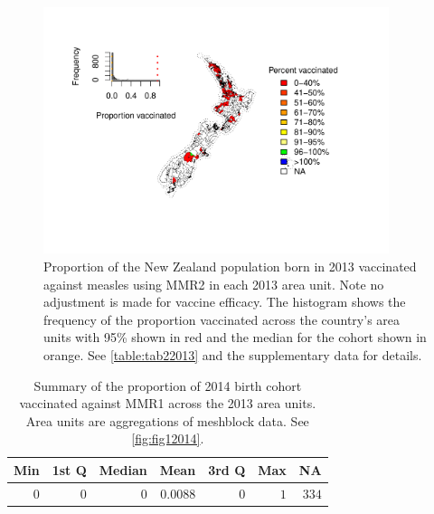 \documentclass{article}
\begin{document}
\begin{figure}
\begin{center}
    \includegraphics[width=0.9\textwidth]{nir_census_MMR2_NIR_2013.pdf}
\end{center}
\caption{Proportion of the New Zealand population born in 2013 vaccinated against measles using MMR2 in each 2013 area unit. Note no adjustment is made for vaccine efficacy. The histogram shows the frequency of the proportion vaccinated across the country's area units with 95\% shown in red and the median for the cohort shown in orange. See \autoref{table:tab22013} and the supplementary data for details.}
\label{fig:fig22013}
\end{figure}

 \vspace{5mm} %
\begin{table}
\begin{center}
\begin{tabular}{rrrrrrr}
\hline\hline
\multicolumn{1}{c}{Min}&\multicolumn{1}{c}{1st Q}&\multicolumn{1}{c}{Median}&\multicolumn{1}{c}{Mean}&\multicolumn{1}{c}{3rd Q}&\multicolumn{1}{c}{Max}&\multicolumn{1}{c}{NA}\tabularnewline
\hline
$0$&$0$&$0$&$0.0088$&$0$&$1$&$334$\tabularnewline
\hline
\end{tabular}\end{center}\caption{Summary of the proportion of 2014 birth cohort vaccinated against MMR1 across the 2013 area units. Area units are aggregations of meshblock data. See \autoref{fig:fig12014}.}
\label{table:tab12014}
\end{table}
\end{document}
